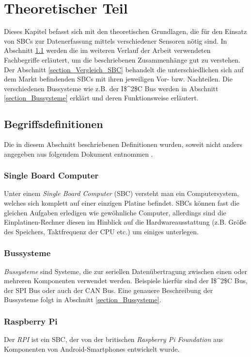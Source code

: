 \chapter{Theoretischer Teil}
\label{chapter_TheoretischerTeil}
Dieses Kapitel befasst sich mit den theoretischen Grundlagen, die für den Einsatz von \acp{SBC} zur Datenerfassung mittels verschiedener Sensoren nötig sind. In Abschnitt \ref{section_Begriffsdefiniton} werden die im weiteren Verlauf der Arbeit verwendeten Fachbegriffe erläutert, um die beschriebenen Zusammenhänge gut zu verstehen. Der Abschnitt \ref{section_Vergleich_SBC} behandelt die unterschiedlichen sich auf dem Markt befindenden \acp{SBC} mit ihren jeweiligen Vor- bzw. Nachteilen. Die verschiedenen Bussysteme wie z.B. der \ac{I$^2$C}  Bus werden in Abschnitt \ref{section_Bussysteme} erklärt und deren Funktionsweise erläutert. 


\section{Begriffsdefinitionen}
\label{section_Begriffsdefiniton}
Die in diesem Abschnitt beschriebenen Definitionen wurden, soweit nicht anders angegeben aus folgendem Dokument entnommen \citep{Bussysteme_in_der_Praxis}.

\subsection*{Single Board Computer}
Unter einem \textit{Single Board Computer} (\ac{SBC}) versteht man ein Computersystem, welches sich komplett auf einer einzigen Platine befindet. \acp{SBC} können fast die gleichen Aufgaben erledigen wie gewöhnliche Computer, allerdings sind die Einplatinen-Rechner diesen im Hinblick auf die Hardwareausstattung (z.B. Größe des Speichers, Taktfrequenz der CPU etc.) um einiges unterlegen.

\subsection*{Bussysteme}
\textit{Bussysteme} sind Systeme, die  zur seriellen Datenübertragung zwischen einen oder mehreren Komponenten verwendet werden. Beispiele hierfür sind der \ac{I$^2$C} Bus, der \ac{SPI} Bus oder auch der \ac{CAN} Bus. Eine genauere Beschreibung der Bussysteme folgt in Abschnitt \ref{section_Bussysteme}.

\subsection*{Raspberry Pi}
Der \textit{\ac{RPI}} ist ein \ac{SBC}, der von der britischen \textit{Raspberry Pi Foundation} aus Komponenten von Android-Smartphones entwickelt wurde.

